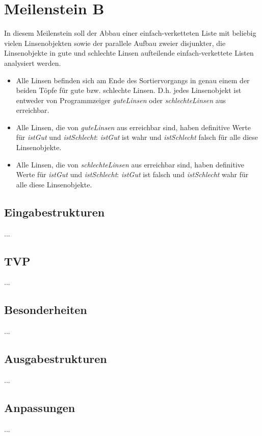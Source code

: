 \section{Meilenstein B}
In diesem Meilenstein soll der Abbau einer einfach-verketteten Liste mit beliebig vielen Linsenobjekten sowie der parallele Aufbau zweier disjunkter, die Linsenobjekte in gute und schlechte Linsen aufteilende einfach-verkettete Listen analysiert werden.
\begin{itemize}
	\item Alle Linsen befinden sich am Ende des Sortiervorgangs in genau einem der beiden Töpfe für gute bzw. schlechte Linsen. D.h. jedes Linsenobjekt ist entweder von Programmzeiger \emph{guteLinsen} oder \emph{schlechteLinsen} aus erreichbar.
	\item Alle Linsen, die von \emph{guteLinsen} aus erreichbar sind, haben definitive Werte für \emph{istGut} und \emph{istSchlecht}: \emph{istGut} ist wahr und \emph{istSchlecht} falsch für alle diese Linsenobjekte.
	\item Alle Linsen, die von \emph{schlechteLinsen} aus erreichbar sind, haben definitive Werte für \emph{istGut} und \emph{istSchlecht}: \emph{istGut} ist falsch und \emph{istSchlecht} wahr für alle diese Linsenobjekte.
\end{itemize}


\subsection{Eingabestrukturen}
...


\subsection{TVP}
...


\subsection{Besonderheiten}
...


\subsection{Ausgabestrukturen}
...


\subsection{Anpassungen}
...
